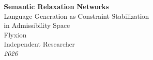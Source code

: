 \documentclass[11pt, a4paper]{article}
\theoremstyle{srn}
\theoremstyle{srnremark}
\begin{document}

\begin{center}
  {\LARGE\bfseries\sffamily
    Semantic Relaxation Networks}\\[0.25em]
  {\large\sffamily
    Language Generation as Constraint Stabilization\\
    in Admissibility Space}\\[0.9em]
  {\normalsize\sffamily Flyxion}\\[0.2em]
  {\small\sffamily Independent Researcher}\\[0.7em]
  {\small\sffamily\itshape 2026}
\end{center}

\vspace{0.7em}
\end{document}
